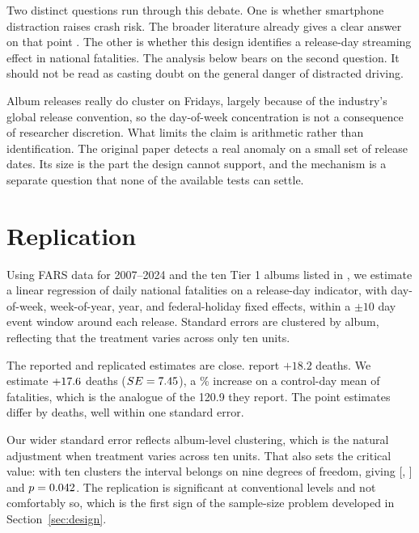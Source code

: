 \documentclass[11pt]{article}
\begin{document}
Two distinct questions run through this debate. One is whether smartphone distraction raises crash risk. The broader literature already gives a clear answer on that point \citep{klauer2006impact,regan2011driver,dingus2016crash,nhtsa2013visual}. The other is whether this design identifies a release-day streaming effect in national fatalities. The analysis below bears on the second question. It should not be read as casting doubt on the general danger of distracted driving.

Album releases really do cluster on Fridays, largely because of the industry's global release
convention, so the day-of-week concentration is not a consequence of researcher discretion. What
limits the claim is arithmetic rather than identification. The original paper detects a real
anomaly on a small set of release dates. Its size is the part the design cannot support, and the
mechanism is a separate question that none of the available tests can settle.

\section{Replication}
\label{sec:replication}

Using FARS data for 2007--2024 and the ten Tier 1 albums listed in \citet{patel2026smartphones}, we estimate a linear regression of daily national fatalities on a release-day indicator, with day-of-week, week-of-year, year, and federal-holiday fixed effects, within a $\pm 10$ day event window around each release. Standard errors are clustered by album, reflecting that the treatment varies across only ten units.

The reported and replicated estimates are close. \citeauthor{patel2026smartphones} report $+18.2$
deaths. We estimate $+17.6$ deaths ($SE = 7.45$), a
\numPctRegression\% increase on a control-day mean of \numControlMean{} fatalities, which is the
analogue of the 120.9 they report. The point estimates differ by \numDiffFromPaper{} deaths, well
within one standard error.

Our wider standard error reflects album-level clustering, which is the natural adjustment when
treatment varies across ten units. That also sets the critical value: with ten clusters the
interval belongs on nine degrees of freedom, giving [\numCIRegressionLo, \numCIRegressionHi] and
$p = 0.042$. The replication is significant at conventional levels and not comfortably
so, which is the first sign of the sample-size problem developed in Section~\ref{sec:design}.
\end{document}
